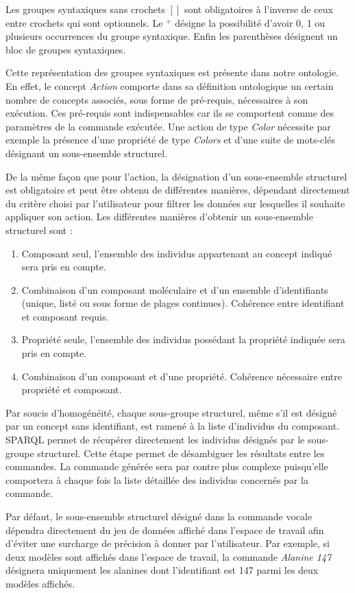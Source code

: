Les groupes syntaxiques sans crochets $[]$ sont obligatoires à l'inverse de ceux entre crochets qui sont optionnels. Le $^+$ désigne la possibilité d'avoir 0, 1 ou plusieurs occurrences du groupe syntaxique. Enfin les parenthèses désignent un bloc de groupes syntaxiques.

Cette représentation des groupes syntaxiques est présente dans notre ontologie. En effet, le concept \textit{Action} comporte dans sa définition ontologique un certain nombre de concepts associés, sous forme de pré-requis, nécessaires à son exécution. Ces pré-requis sont indispensables car ils se comportent comme des paramètres de la commande exécutée. Une action de type \textit{Color} nécessite par exemple la présence d'une propriété de type \textit{Colors} et d'une suite de mots-clés désignant un sous-ensemble structurel. 

De la même façon que pour l'action, la désignation d'un sous-ensemble structurel est obligatoire et peut être obtenu de différentes manières, dépendant directement du critère choisi par l'utilisateur pour filtrer les données sur lesquelles il souhaite appliquer son action. Les différentes manières d'obtenir un sous-ensemble structurel sont :

\begin{enumerate}
  \item Composant seul, l'ensemble des individus appartenant au concept indiqué sera pris en compte.
  \item Combinaison d'un composant moléculaire et d'un ensemble d'identifiants (unique, listé ou sous forme de plages continues). Cohérence entre identifiant et composant requis.
  \item Propriété seule, l'ensemble des individus possédant la propriété indiquée sera pris en compte.
  \item Combinaison d'un composant et d'une propriété. Cohérence nécessaire entre propriété et composant.
\end{enumerate}

Par soucis d'homogénéité, chaque sous-groupe structurel, même s'il est désigné par un concept sans identifiant, est ramené à la liste d'individus du composant. SPARQL permet de récupérer directement les individus désignés par le sous-groupe structurel. Cette étape permet de désambiguer les résultats entre les commandes. La commande générée sera par contre plus complexe puisqu'elle comportera à chaque fois la liste détaillée des individus concernés par la commande.

Par défaut, le sous-ensemble structurel désigné dans la commande vocale dépendra directement du jeu de données affiché dans l'espace de travail afin d'éviter une surcharge de précision à donner par l'utilisateur. Par exemple, si deux modèles sont affichés dans l'espace de travail, la commande \textit{Alanine 147} désignera uniquement les alanines dont l'identifiant est 147 parmi les deux modèles affichés. 


